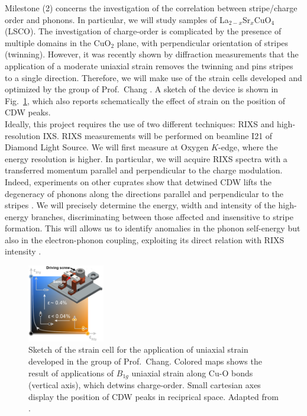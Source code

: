 \documentclass[a4paper, 12pt]{article}
\begin{document}
Milestone (2) concerns the investigation of the correlation between stripe/charge order and phonons. In particular, we will study samples of La$_{2-x}$Sr$_x$CuO$_4$ (LSCO).  The investigation of charge-order is complicated by the presence of multiple domains in the CuO$_2$ plane, with perpendicular orientation of stripes (twinning). However, it was recently shown by diffraction measurements \cite{choi2022unveiling} that the application of a moderate uniaxial strain removes the twinning and pins stripes to a single direction. Therefore, we will make use of the strain cells developed and optimized by the group of Prof.~Chang \cite{wang2022uniaxial, choi2022unveiling}. A sketch of the device is shown in Fig.~\ref{fig:strain}, which also reports schematically the effect of strain on the position of CDW peaks. \\
Ideally, this project requires the use of two different techniques: RIXS and high-resolution IXS.
RIXS  measurements will be performed on beamline I21 of Diamond Light Source. We will first measure at Oxygen $K$-edge, where the energy resolution is higher. In particular, we will acquire RIXS spectra with a transferred momentum parallel and perpendicular to the charge modulation. 
Indeed, experiments on other cuprates show that detwined CDW lifts the degeneracy of phonons along the directions parallel and perpendicular to the stripes \cite{pint2004oxygen,reznik2003oxygen}. We will precisely determine the energy, width and intensity of the high-energy branches, discriminating between those affected and insensitive to stripe formation. 
This will allows us to identify anomalies in the phonon self-energy \cite{wang2021charge, dashwood2021probing} but also in the electron-phonon coupling, exploiting its direct relation with RIXS intensity \cite{braicovich2020determining}. 
%
\begin{figure}
  \centering
    \includegraphics[width=0.3\textwidth]{straincell.eps}
  \caption{Sketch of the strain cell for the application of uniaxial strain developed in the group of Prof.~Chang. Colored maps shows the result of applications of $B_{1g}$ uniaxial strain along Cu-O bonds (vertical axis), which detwins charge-order. Small cartesian axes display the position of CDW peaks in reciprical space. Adapted from \cite{wang2022uniaxial}.}
  \label{fig:strain}
\end{figure}
\end{document}
